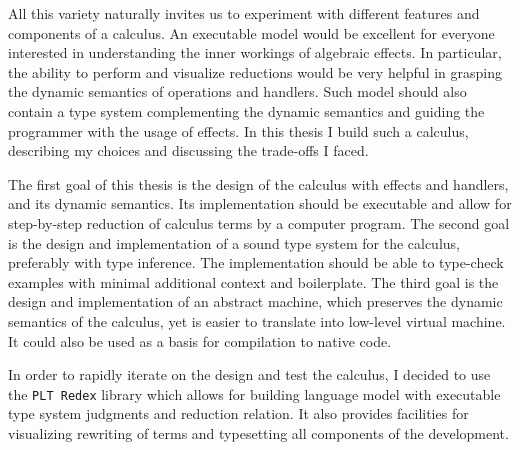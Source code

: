 \documentclass[inz, english, longabstract]{iithesis}
\newcommand{\Redex}{\texttt{PLT Redex}}
\begin{document}
All this variety naturally invites us to experiment with different features and components of a calculus.
An executable model would be excellent for everyone interested in understanding the inner workings of algebraic effects.
In particular, the ability to perform and visualize reductions would be very helpful in grasping the dynamic semantics of operations and handlers.
Such model should also contain a type system complementing the dynamic semantics and guiding the programmer with the usage of effects.
In this thesis I build such a calculus, describing my choices and discussing the trade-offs I faced.

The first goal of this thesis is the design of the calculus with effects and handlers, and its dynamic semantics.
Its implementation should be executable and allow for step-by-step reduction of calculus terms by a computer program.
The second goal is the design and implementation of a sound type system for the calculus, preferably with type inference.
The implementation should be able to type-check examples with minimal additional context and boilerplate.
The third goal is the design and implementation of an abstract machine, which preserves the dynamic semantics of the calculus, yet is easier to translate into low-level virtual machine.
It could also be used as a basis for compilation to native code.

In order to rapidly iterate on the design and test the calculus, I decided to use the \Redex{} library which allows for building language model with executable type system judgments and reduction relation.
It also provides facilities for visualizing rewriting of terms and typesetting all components of the development.
\end{document}

